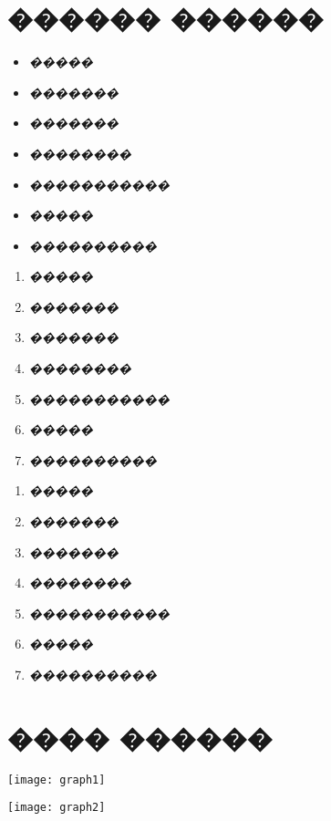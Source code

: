 \documentclass[a4paper,11pt]{article}
\begin{document}
\vspace{20pt}

\section{������ ������}
		
		\begin{itemize}  
			\item \textit{�����}
			\item \textit{�������}
			\item \textit{�������}
			\item \textit{��������}
			\item \textit{�����������}
			\item \textit{�����}
			\item \textit{����������}	
		\end{itemize}	
		
		\begin{enumerate}  
			\item \textit{�����}
			\item \textit{�������}
			\item \textit{�������}
			\item \textit{��������}
			\item \textit{�����������}
			\item \textit{�����}
			\item \textit{����������}	
		\end{enumerate}	
		
		\begin{enumerate}[label=\textbf{(\greek*})]
			\item \textit{�����}
			\item \textit{�������}
			\item \textit{�������}
			\item \textit{��������}
			\item \textit{�����������}
			\item \textit{�����}
			\item \textit{����������}	
		\end{enumerate}	

\vspace{20pt}

\section{���� ������}



	\texttt{[image: graph1]}
	
	\vspace{10pt}
	
	\texttt{[image: graph2]}
	 







\end{document}
